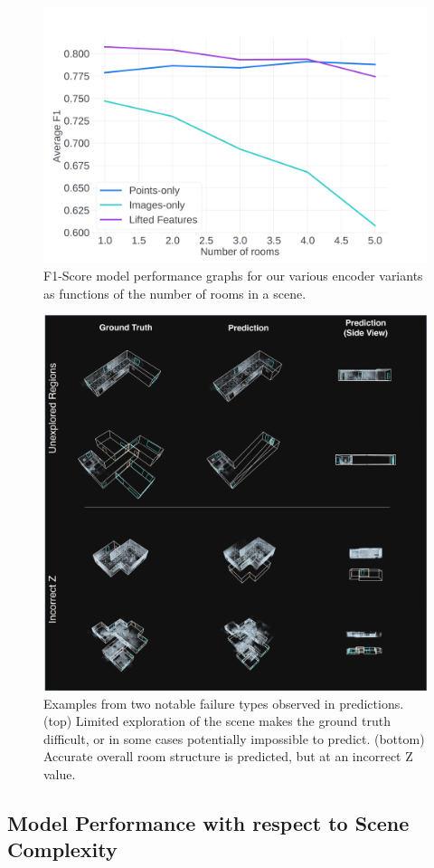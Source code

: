 \begin{figure}[t]
    \centering
    \includegraphics[width=0.5\columnwidth]{figs/roomsvsf1.jpg}
    \caption{
        F1-Score model performance graphs
        for our various encoder variants
        as functions of the number of rooms in a scene.
    }
    \label{fig:roomsf1}
\end{figure}
\label{subsec:failure_cases}
\begin{figure}[h]
    \centering
    \includegraphics[width=0.8\columnwidth]{figs/failures.jpg}
    \caption{Examples from two notable failure types observed in \METHOD predictions. (top) Limited exploration of the scene makes the ground truth difficult, or in some cases potentially impossible to predict. (bottom) Accurate overall room structure is predicted, but at an incorrect Z value.}
    \label{fig:failures}
\end{figure}

\subsection{Model Performance with respect to Scene Complexity}
\label{app:num_rooms}


